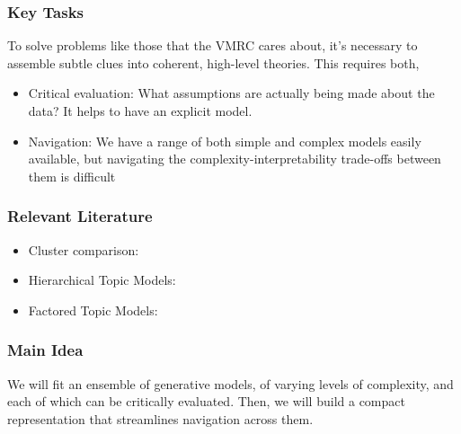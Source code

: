 \documentclass{beamer}
\begin{document}
\begin{frame}
  \frametitle{Key Tasks}
  To solve problems like those that the VMRC cares about, it's necessary to
  assemble subtle clues into coherent, high-level theories. This requires both,
  \begin{itemize}
    \item Critical evaluation: What assumptions are actually being made about
    the data? It helps to have an explicit model.
    \item Navigation: We have a range of both simple and complex models easily
    available, but navigating the complexity-interpretability trade-offs between
    them is difficult
  \end{itemize}
\end{frame}

\begin{frame}
  \frametitle{Relevant Literature}
  \begin{itemize}
    \item Cluster comparison:
    \item Hierarchical Topic Models:
    \item Factored Topic Models:
  \end{itemize}
\end{frame}

\begin{frame}
  \frametitle{Main Idea}
  We will fit an ensemble of generative models, of varying levels of complexity,
  and each of which can be critically evaluated. Then, we will build a compact
  representation that streamlines navigation across them.

\begin{figure}
    \centering
\end{figure}
\end{frame}
\end{document}
